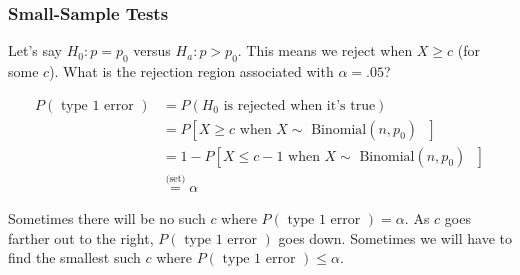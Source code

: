 \documentclass{beamer}
\begin{document}
\begin{frame}
\frametitle{Small-Sample Tests}

Let's say $H_0: p = p_0$ versus $H_a: p > p_0$. This means we reject when $X \ge c$ (for some $c$). What is the rejection region associated with $\alpha = .05$?
\newline

\begin{align*}
P(\text{ type 1 error }) &= P(H_0 \text{ is rejected when it's true} ) \\
&= P \left[ X \ge c \text{ when $X \sim $ Binomial$(n,p_0)$ } \right] \\
&= 1 - P \left[ X \le c - 1 \text{ when $X \sim $ Binomial$(n,p_0)$ } \right] \\
&\overset{\text{(set)}}{=} \alpha
\end{align*}

Sometimes there will be no such $c$ where $P(\text{ type 1 error }) = \alpha$. As $c$ goes farther out to the right, $P(\text{ type 1 error })$ goes down. Sometimes we will have to find the smallest such $c$ where $P(\text{ type 1 error }) \le \alpha$.
\end{frame}
\end{document}
